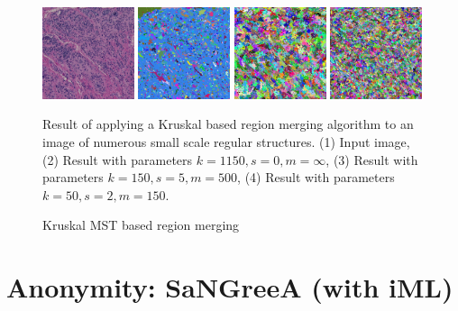 	\begin{figure}[H]
		\begin{center}
			\includegraphics [width=0.24\textwidth] {figures/kruskal/sample2_input}
			\includegraphics [width=0.24\textwidth] {figures/kruskal/out_rm_01}
			\includegraphics [width=0.24\textwidth] {figures/kruskal/out_rm_02}
			\includegraphics [width=0.24\textwidth] {figures/kruskal/out_rm_03}
			\caption{Kruskal MST based region merging}
		\end{center}
		\small 
		Result of applying a Kruskal based region merging algorithm to an image of numerous small scale regular structures. (1) Input image, (2) Result with parameters $k=1150, s=0, m=\infty$, (3) Result with parameters $k=150, s=5, m=500$, (4) Result with parameters $k=50, s=2, m=150 $.
		
	\end{figure}


\section{Anonymity: SaNGreeA (with iML)}
\label{sect:anonymization}

